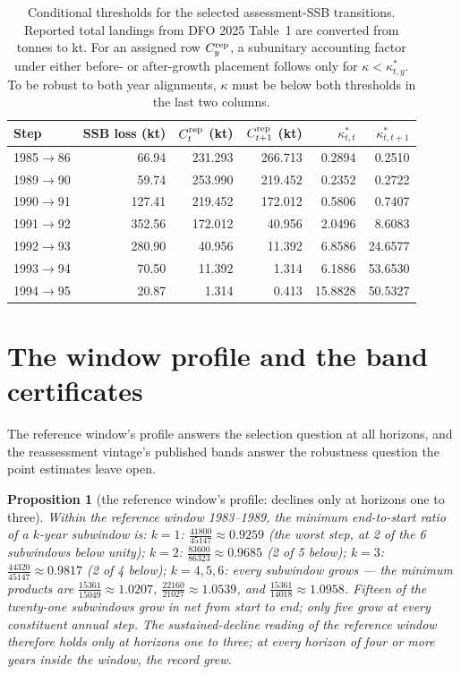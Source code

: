 \documentclass[10pt,twocolumn]{article}
\theoremstyle{plain}
\newtheorem{proposition}[theorem]{Proposition}
\theoremstyle{remark}
\begin{document}
\begin{table}[t]
\centering
\scriptsize
\setlength{\tabcolsep}{4pt}
\caption{Conditional thresholds for the selected assessment-SSB transitions. Reported total landings from DFO 2025 Table~1 are converted from tonnes to kt. For an assigned row \(C_y^{\rm rep}\), a subunitary accounting factor under either before- or after-growth placement follows only for \(\kappa<\kappa^*_{t,y}\). To be robust to both year alignments, \(\kappa\) must be below both thresholds in the last two columns.}
\label{tab:brackets}
\begin{tabular}{@{}lrrrrr@{}}
\toprule
Step & SSB loss (kt) & \(C_t^{\rm rep}\) (kt) & \(C_{t+1}^{\rm rep}\) (kt) & \(\kappa^*_{t,t}\) & \(\kappa^*_{t,t+1}\) \\
\midrule
1985$\to$86 & 66.94 & 231.293 & 266.713 & 0.2894 & 0.2510 \\
1989$\to$90 & 59.74 & 253.990 & 219.452 & 0.2352 & 0.2722 \\
1990$\to$91 & 127.41 & 219.452 & 172.012 & 0.5806 & 0.7407 \\
1991$\to$92 & 352.56 & 172.012 & 40.956 & 2.0496 & 8.6083 \\
1992$\to$93 & 280.90 & 40.956 & 11.392 & 6.8586 & 24.6577 \\
1993$\to$94 & 70.50 & 11.392 & 1.314 & 6.1886 & 53.6530 \\
1994$\to$95 & 20.87 & 1.314 & 0.413 & 15.8828 & 50.5327 \\
\bottomrule
\end{tabular}
\end{table}

\section{The window profile and the band certificates}\label{profile}

The reference window's profile answers the selection question at all
horizons, and the reassessment vintage's published bands answer the
robustness question the point estimates leave open.

\begin{proposition}[the reference window's profile: declines only at
horizons one to three]\label{prop:profile}
Within the reference window 1983--1989, the minimum end-to-start ratio
of a \(k\)-year subwindow is: \(k=1\):
\(\tfrac{41800}{45147} \approx 0.9259\) (the worst step, at 2 of the 6
subwindows below unity); \(k=2\): \(\tfrac{83600}{86323} \approx
0.9685\) (2 of 5 below); \(k=3\): \(\tfrac{44320}{45147} \approx
0.9817\) (2 of 4 below); \(k = 4, 5, 6\): every subwindow grows ---
the minimum products are \(\tfrac{15361}{15049} \approx 1.0207\),
\(\tfrac{22160}{21027} \approx 1.0539\), and
\(\tfrac{15361}{14018} \approx 1.0958\). Fifteen of the twenty-one
subwindows grow in net from start to end; only five grow at
every constituent annual step. The sustained-decline
reading of the reference window therefore holds only at horizons one
to three; at every horizon of four or more years inside the window,
the record grew.
\end{proposition}
\end{document}
